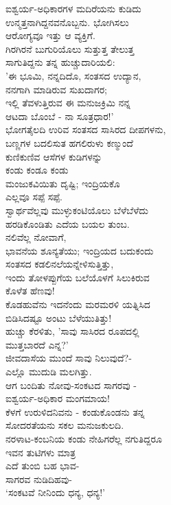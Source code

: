 \begin{myquote}
ಐಶ್ವರ್ಯ-ಅಧಿಕಾರಗಳ ಮದಿರೆಯನು ಕುಡಿದು\\ಉನ್ಮತ್ತನಾಗಿದ್ದನವನೊಬ್ಬನು. ಭೋಗಿಸಲು\\ಆರೋಗ್ಯವೂ ಇತ್ತು ಆ ವ್ಯಕ್ತಿಗೆ.\\ಗಿರಗಿರನೆ ಬುಗುರಿಯೊಲು ಸುತ್ತುತ್ತ ತೇಲುತ್ತ\\ಸಾಗುತಿದ್ದನು ತನ್ನ ಹುಚ್ಚುದಾರಿಯಲಿ:\\'ಈ ಭೂಮಿ, ನನ್ನದಿದೊ, ಸಂತಸದ ಉದ್ಯಾನ,\\ನನಗಾಗಿ ಮಾಡಿರುವ ಸುಖದಾಗರ;\\ಇಲ್ಲಿ ತೆವಳುತ್ತಿರುವ ಈ ಮನುಜಕ್ರಿಮಿ ನನ್ನ\\ಆಟದಾ ಬೊಂಬೆ - ನಾ ಸೂತ್ರಧಾರ!'\\ಭೋಗತೈಲದಿ ಉರಿವ ಸಂತಸದ ಸಾಸಿರದ ದೀಪಗಳನು,\\ಬಣ್ಣಗಳ ಬದಲಿಸುತ ಹಗಲಿರುಳು ಕಣ್ಮುಂದೆ\\ಕುಣಿಕುಣಿವ ಆಸೆಗಳ ಕುಡಿಗಳನ್ನು\\ಕಂಡು ಕಂಡೂ ಕಂಡು\\ಮಂಜುಕವಿಯಿತು ದೃಷ್ಟಿ; ಇಂದ್ರಿಯಕೊ\\ಎಲ್ಲವೂ ಸಪ್ಪೆ ಸಪ್ಪೆ.\\ಸ್ವಾರ್ಥವೆಲ್ಲವು ಮುಳ್ಳುಕಂಟಿಯೊಲು ಬೆಳೆಬೆಳೆದು\\ಹರಡಿಕೊಂಡಿತು ಎದೆಯ ಬಯಲ ತುಂಬ.\\ನಲಿವೆಲ್ಲ ನೋವಾಗೆ,\\ಭಾವನೆಯ ಶೂನ್ಯತೆಯು; ಇಂದ್ರಿಯದ ಬದುಕಂದು\\ಸಂತಸದ ಕಡಲಿನಲೆಯನ್ನೇಳಿಸುತ್ತಿತ್ತು,\\ಇಂದು ತೋಳಪ್ಪುಗೆಯ ಬಲೆಯೊಳಗೆ ಸಿಲುಕಿರುವ\\ಕೊಳೆತ ಹೆಣವು!\\ಕೊಡಹುವೆನು ಇದನೆಂದು ಮರಮರಳಿ ಯತ್ನಿಸಿದ\\ಬಿಡಿಸಿದಷ್ಟೂ ಅಂಟು ಬೆಳೆಯುತಿತ್ತು!\\ಹುಚ್ಚು ಕೆರಳಿತು, 'ಸಾವು ಸಾಸಿರದ ರೂಪದಲ್ಲಿ\\ಮುತ್ತಬಾರದೆ ಎನ್ನ?'\\ಜೀವದಾಸೆಯ ಮುಂದೆ ಸಾವು ನಿಲುವುದೆ?-\\ಎಲ್ಲೊ ಮುದುಡಿ ಮಲಗಿತ್ತು.\\ಆಗ ಬಂದಿತು ನೋವು-ಸಂಕಟದ ಸಾಗರವು -\\ಐಶ್ವರ್ಯ-ಅಧಿಕಾರ ಮಂಗಮಾಯ!\\ಕೆಳಗೆ ಉರುಳಿದನಿವನು - ಕಂಡುಕೊಂಡನು ತನ್ನ\\ಸೋದರತೆಯನು ಸಕಲ ಮನುಜಕುಲದಿ.\\ನರಳಾಟ-ಕಂಬನಿಯ ಕಂಡು ನೇಹಿಗರೆಲ್ಲ ನಗುತಿದ್ದರೂ\\ಇವನ ತುಟಿಗಳು ಮಾತ್ರ\\ಎದೆ ತುಂಬಿ ಬಹ ಭಾವ-\\ಸಾಗರವ ನುಡಿದಿಹವು-\\‘ಸಂಕಟವೆ ನೀನಿಂದು ಧನ್ಯ, ಧನ್ಯ!’
\end{myquote}

